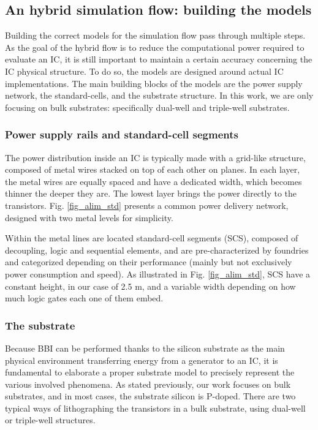 \subsection{An hybrid simulation flow: building the models}
	Building the correct models for the simulation flow pass through multiple steps.
	As the goal of the hybrid flow is to reduce the computational power required to evaluate an IC, it is still important to maintain a certain accuracy concerning the IC physical structure.
	To do so, the models are designed around actual IC implementations.
	The main building blocks of the models are the power supply network, the standard-cells, and the substrate structure.
	In this work, we are only focusing on bulk substrates: specifically dual-well and triple-well substrates.

	\subsubsection{Power supply rails and standard-cell segments}
	
	The power distribution inside an IC is typically made with a grid-like structure, composed of metal wires stacked on top of each other on planes.
	In each layer, the metal wires are equally spaced and have a dedicated width, which becomes thinner the deeper they are.
	The lowest layer brings the power directly to the transistors.
	Fig. \ref{fig_alim_std} presents a common power delivery network, designed with two metal levels for simplicity.

	Within the metal lines are located standard-cell segments (SCS), composed of decoupling, logic and sequential elements, and are pre-characterized by foundries and categorized depending on their performance (mainly but not exclusively power consumption and speed).
	As illustrated in Fig. \ref{fig_alim_std}, SCS have a constant height, in our case of 2.5 \textmu m, and a variable width depending on how much logic gates each one of them embed.

	\subsubsection{The substrate}
	
	Because BBI can be performed thanks to the silicon substrate as the main physical environment transferring energy from a generator to an IC, it is fundamental to elaborate a proper substrate model to precisely represent the various involved phenomena.
	As stated previously, our work focuses on bulk substrates, and in most cases, the substrate silicon is P-doped.
	There are two typical ways of lithographing the transistors in a bulk substrate, using dual-well or triple-well structures.

